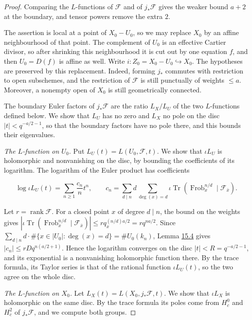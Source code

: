 \documentclass[11pt]{article}
\begin{document}
\begin{proof}[{Proof}]\label{bp135}%
Comparing the \(L\)-functions of \(\mathcal F\) and of \(j_*\mathcal F\) gives the weaker bound \(a+2\) at the boundary, and tensor powers remove the extra \(2\).

The assertion is local at a point of \(X_0-U_0\), so we may replace \(X_0\) by an affine neighbourhood of that point. The complement of \(U_0\) is an effective Cartier divisor, so after shrinking this neighbourhood it is cut out by one equation \(f\), and then \(U_0=D(f)\) is affine as well. Write \(i:Z_0=X_0-U_0\hookrightarrow X_0\). The hypotheses are preserved by this replacement. Indeed, forming \(j_*\) commutes with restriction to open subschemes, and the restriction of \(\mathcal F\) is still punctually of weights \(\le a\). Moreover, a nonempty open of \(X_0\) is still geometrically connected.

The boundary Euler factors of \(j_*\mathcal F\) are the ratio \(L_X/L_U\) of the two \(L\)-functions defined below. We show that \(L_U\) has no zero and \(L_X\) no pole on the disc \(|t|<q^{-a/2-1}\), so that the boundary factors have no pole there, and this bounds their eigenvalues.

\emph{The \(L\)-function on \(U_0\).} Put \(L_U(t)=L(U_0,\mathcal F,t)\). We show that \(\iota L_U\) is holomorphic and nonvanishing on the disc, by bounding the coefficients of its logarithm. The logarithm of the Euler product has coefficients

\[
\log\iota L_U(t)=\sum_{n\ge1}\frac{c_n}{n}t^n,
\qquad
c_n=\sum_{d\mid n}d\sum_{\deg(x)=d}
\iota\operatorname{Tr}(\operatorname{Frob}_x^{n/d}\mid\mathcal F_{\bar x}).
\]

Let \(r=\operatorname{rank}\mathcal F\). For a closed point \(x\) of degree \(d\mid n\), the bound on the weights gives \(|\iota\operatorname{Tr}(\operatorname{Frob}_x^{n/d}\mid\mathcal F_{\bar x})|
\le rq_x^{(n/d)a/2}=rq^{na/2}\). Since \(\sum_{d\mid n}d\cdot\#\{x\in|U_0|:\deg(x)=d\}=\#U_0(k_n)\), Lemma \hyperref[bp131]{15.4} gives \(|c_n|\le rDq^{n(a/2+1)}\). Hence the logarithm converges on the disc \(|t|<R=q^{-a/2-1}\), and its exponential is a nonvanishing holomorphic function there. By the trace formula, its Taylor series is that of the rational function \(\iota L_U(t)\), so the two agree on the whole disc.

\emph{The \(L\)-function on \(X_0\).} Let \(L_X(t)=L(X_0,j_*\mathcal F,t)\). We show that \(\iota L_X\) is holomorphic on the same disc. By the trace formula its poles come from \(H^0_c\) and \(H^2_c\) of \(j_*\mathcal F\), and we compute both groups.


\end{proof}
\end{document}
